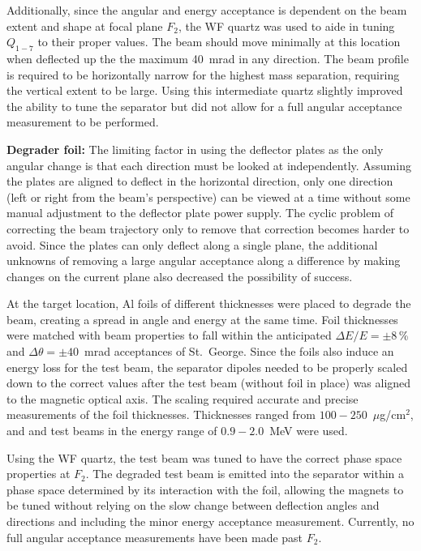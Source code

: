 Additionally, since the angular and energy acceptance is dependent on
the beam extent and shape at focal plane $F_2$, the WF quartz was used
to aide in tuning $Q_{1-7}$ to their proper values. The beam should move
minimally at this location when deflected up the the maximum 40~mrad in
any direction. The beam profile is required to be horizontally narrow
for the highest mass separation, requiring the vertical extent to be
large. Using this intermediate quartz slightly improved the ability to
tune the separator but did not allow for a full angular acceptance
measurement to be performed.

\textbf{Degrader foil:}
The limiting factor in using the deflector plates as the only angular
change is that each direction must be looked at independently. Assuming
the plates are aligned to deflect in the horizontal direction, only one
direction (left or right from the beam's perspective) can be viewed at a
time without some manual adjustment to the deflector plate power supply.
The cyclic problem of correcting the beam trajectory only to remove that
correction becomes harder to avoid. Since the plates can only deflect
along a single plane, the additional unknowns of removing a large
angular acceptance along a difference by making changes on the current
plane also decreased the possibility of success.

At the target location, Al foils of different thicknesses were placed to
degrade the beam, creating a spread in angle and energy at the same
time. Foil thicknesses were matched with beam properties to fall within
the anticipated $\Delta E/E = \pm 8$\,\% and $\Delta\theta = \pm
40$~mrad acceptances of St.\ George. Since the foils also induce an
energy loss for the test beam, the separator dipoles needed to be
properly scaled down to the correct values after the test beam (without
foil in place) was aligned to the magnetic optical axis. The scaling
required accurate and precise measurements of the foil thicknesses.
Thicknesses ranged from $100-250$~$\mu$g/cm$^2$, and  and
 test beams in the energy range of $0.9-2.0$~MeV were used.

Using the WF quartz, the test beam was tuned to have the correct phase
space properties at $F_2$. The degraded test beam is emitted into the
separator within a phase space determined by its interaction with the
foil, allowing the magnets to be tuned without relying on the slow
change between deflection angles and directions and including the minor
energy acceptance measurement. Currently, no full angular acceptance
measurements have been made past $F_2$.

